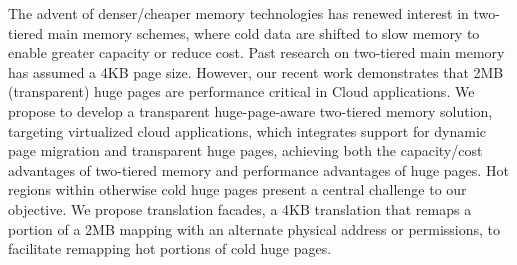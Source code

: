 The advent of denser/cheaper memory technologies has renewed interest in
two-tiered main memory schemes, where cold data are shifted to slow memory to
enable greater capacity or reduce cost.  Past research on two-tiered main memory
has assumed a 4KB page size.  However, our recent work demonstrates that 2MB
(transparent) huge pages are performance critical in Cloud applications.  We
propose to develop a transparent huge-page-aware two-tiered memory solution,
targeting virtualized cloud applications, which integrates support for dynamic
page migration and transparent huge pages, achieving both the capacity/cost
advantages of two-tiered memory and performance advantages of huge pages. Hot
regions within otherwise cold huge pages present a central challenge to our
objective. We propose translation facades, a 4KB translation that remaps a
portion of a 2MB mapping with an alternate physical address or permissions, to
facilitate remapping hot portions of cold huge pages.
